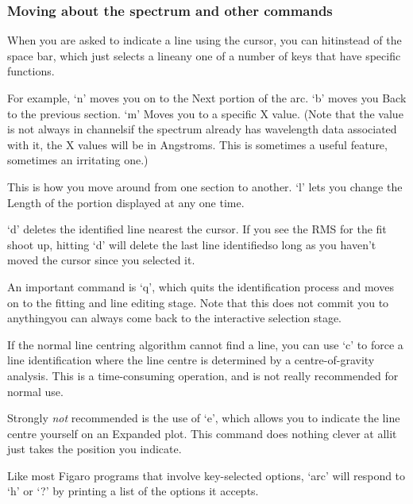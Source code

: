 
\subsubsection{\label{techno10moving}Moving about the spectrum and other commands}

   When you are asked to indicate a line using the cursor, you can
   hit\latorhtm{---}{-}instead of the space bar, which just selects a
   line\latorhtm{---}{-}any one
   of a number of keys that have specific functions.

   For example, `n' moves you on to the Next portion of the arc. `b'
   moves you Back to the previous section.  `m' Moves you to a specific
   X value.  (Note that the value is not always in channels\latorhtm{---}{-}if
   the
   spectrum already has wavelength data associated with it, the X values
   will be in Angstroms.  This is sometimes a useful feature, sometimes
   an irritating one.)

   This is how you move around from one section to another.  `l' lets
   you change the Length of the portion displayed at any one time.

   `d' deletes the identified line nearest the cursor.  If you see the
   RMS for the fit shoot up, hitting `d' will delete the last line
   identified\latorhtm{---}{-}so long as you haven't moved the cursor
   since you selected it.

   An important command is `q', which quits the identification process
   and moves on to the fitting and line editing stage. Note that this
   does not commit you to anything\latorhtm{---}{-}you can always come back
   to the interactive selection stage.

   If the normal line centring algorithm cannot find a line, you can
   use `c' to force a line identification where the line centre is
   determined by a centre-of-gravity analysis.  This is a time-consuming
   operation, and is not really recommended for normal use.

   Strongly {\em not\/}
   recommended is the use of `e', which allows you to indicate the line
   centre yourself on an Expanded plot.  This command does nothing
   clever at all\latorhtm{---}{-}it just takes the position you indicate.

   Like most Figaro programs that involve key-selected options, `arc'
   will respond to `h' or `?' by printing a list of the options it
   accepts.

